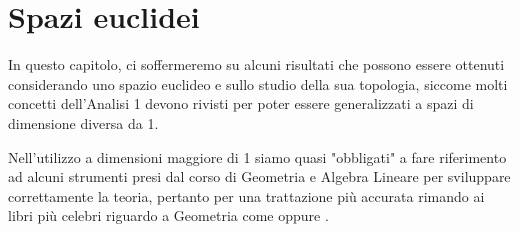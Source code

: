 \chapter{Spazi euclidei}
	\pagestyle{plain}
	\thispagestyle{empty}
	\pagestyle{fancy}	
	In questo capitolo, ci soffermeremo su alcuni risultati che possono essere ottenuti considerando uno spazio euclideo e sullo studio della sua topologia, siccome molti concetti dell'Analisi 1 devono rivisti per poter essere generalizzati a spazi di dimensione diversa da 1. 
	
	Nell'utilizzo a dimensioni maggiore di 1 siamo quasi "obbligati" a fare riferimento ad alcuni strumenti presi dal corso di Geometria e Algebra Lineare per sviluppare correttamente la teoria, pertanto per una trattazione più accurata rimando ai libri più celebri riguardo a Geometria come \cite{lang} oppure \cite{sernesi}.
	
\vspace{0.5cm}
